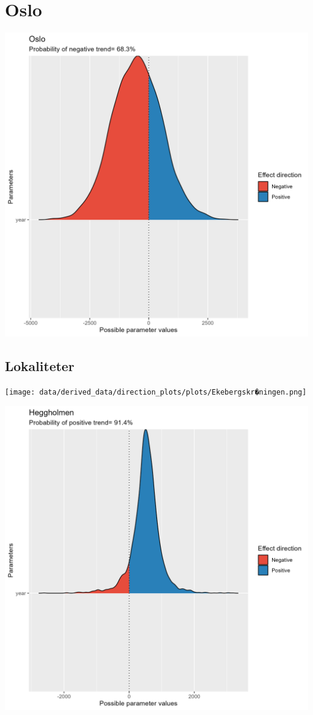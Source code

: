 \documentclass[
  letterpaper,
  DIV=11,
  numbers=noendperiod]{scrreport}
\begin{document}
\hypertarget{oslo-2}{%
\section{Oslo}\label{oslo-2}}

\includegraphics{data/derived_data/direction_plots/plots/Oslo.png}

\hypertarget{lokaliteter-1}{%
\subsection{Lokaliteter}\label{lokaliteter-1}}

\texttt{[image: data/derived\_data/direction\_plots/plots/Ekebergskr�ningen.png]}

\includegraphics{data/derived_data/direction_plots/plots/Heggholmen.png}
\end{document}

